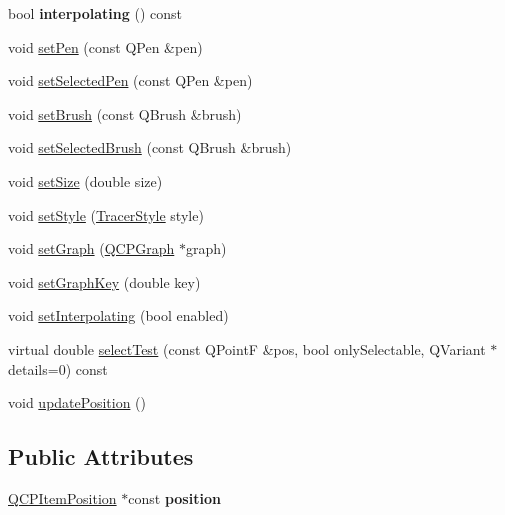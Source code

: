 \begin{DoxyCompactItemize}
\item 
\hypertarget{classQCPItemTracer_ab318c233fa35c17a317af38ce7b3c312}{bool {\bfseries interpolating} () const }\label{classQCPItemTracer_ab318c233fa35c17a317af38ce7b3c312}

\item 
void \hyperlink{classQCPItemTracer_af8048636fc1ef0152e51809b008df2ca}{set\-Pen} (const \-Q\-Pen \&pen)
\item 
void \hyperlink{classQCPItemTracer_ae1bf70db7f13f928660168cd3e5069f3}{set\-Selected\-Pen} (const \-Q\-Pen \&pen)
\item 
void \hyperlink{classQCPItemTracer_a2c303f7470a30084daa201ed556b3c36}{set\-Brush} (const \-Q\-Brush \&brush)
\item 
void \hyperlink{classQCPItemTracer_a0f55c084980a7a312af859d3e7b558ef}{set\-Selected\-Brush} (const \-Q\-Brush \&brush)
\item 
void \hyperlink{classQCPItemTracer_ae47fe0617f5fef5fdb766999569be10a}{set\-Size} (double size)
\item 
void \hyperlink{classQCPItemTracer_a41a2ac4f1acd7897b4e2a2579c03204e}{set\-Style} (\hyperlink{classQCPItemTracer_a2f05ddb13978036f902ca3ab47076500}{\-Tracer\-Style} style)
\item 
void \hyperlink{classQCPItemTracer_af5886f4ded8dd68cb4f3388f390790c0}{set\-Graph} (\hyperlink{classQCPGraph}{\-Q\-C\-P\-Graph} $\ast$graph)
\item 
void \hyperlink{classQCPItemTracer_a6840143b42f3b685cedf7c6d83a704c8}{set\-Graph\-Key} (double key)
\item 
void \hyperlink{classQCPItemTracer_a6c244a9d1175bef12b50afafd4f5fcd2}{set\-Interpolating} (bool enabled)
\item 
virtual double \hyperlink{classQCPItemTracer_ae71f3728421c83c188c117279ca050fd}{select\-Test} (const \-Q\-Point\-F \&pos, bool only\-Selectable, \-Q\-Variant $\ast$details=0) const 
\item 
void \hyperlink{classQCPItemTracer_a5b90296109e36384aedbc8908a670413}{update\-Position} ()
\end{DoxyCompactItemize}
\subsection*{\-Public \-Attributes}
\begin{DoxyCompactItemize}
\item 
\hypertarget{classQCPItemTracer_a69917e2fdb2b3a929c196958feee7cbe}{\hyperlink{classQCPItemPosition}{\-Q\-C\-P\-Item\-Position} $\ast$const {\bfseries position}}\label{classQCPItemTracer_a69917e2fdb2b3a929c196958feee7cbe}

\end{DoxyCompactItemize}
